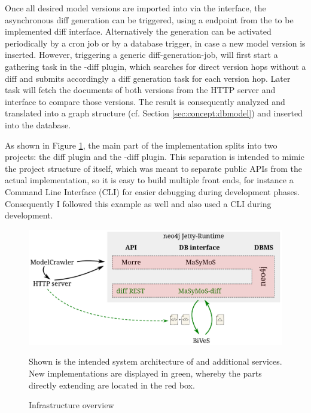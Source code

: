 Once all desired model versions are imported into \masymos via the \morre interface, the  asynchronous diff generation can be triggered, using a \rest endpoint from the to be implemented diff \rest interface. Alternatively the generation can be activated periodically by a cron job or by a database trigger, in case a new model version is inserted.
However, triggering a generic diff-generation-job, will first start a gathering task in the \masymos-diff plugin, which searches for direct version hops without a diff and submits accordingly a diff generation task for each version hop. 
Later task will fetch the \xml documents of both versions from the HTTP server and interface \bives to compare those versions. The result is consequently analyzed and translated into a graph structure (cf. Section \ref{sec:concept:dbmodel}) and inserted into the database.

As shown in Figure \ref{fig:system-overview}, the main part of the implementation splits into two projects: the diff \rest plugin and the \masymos-diff plugin. This separation is intended to mimic the project structure of \masymos itself, which was meant to separate public APIs from the actual implementation, so it is easy to build multiple front ends, for instance a Command Line Interface (CLI) for easier debugging during development phases. Consequently I followed this example as well and also used a CLI during development.

\begin{figure}[h]
	\centering
	\includegraphics[width=\textwidth]{resources/system-overview-matrix.pdf}
	\caption{Infrastructure overview}
	\begin{flushleft}
		Shown is the intended system architecture of \masymos \neoj and additional services. New implementations are displayed in green, whereby the parts directly extending \neoj are located in the red box.
	\end{flushleft}
	\label{fig:system-overview}
\end{figure}


